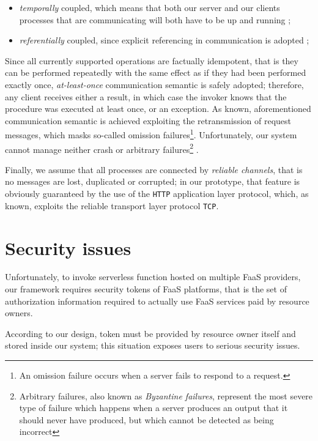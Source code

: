 \documentclass[12pt,a4paper]{report}
\begin{document}
\begin{itemize}
	
	\item \textit{temporally} coupled, which means that both our server and our clients processes that are communicating will both have to be up and running \cite{SDCC};
	
	\item \textit{referentially} coupled, since explicit referencing in communication is adopted \cite{SDCC};
	
\end{itemize}

Since all currently supported operations are factually idempotent, that is they can be performed repeatedly with the same effect as if they had been performed exactly once\cite{SDCCNUMERO2}, \textit{at-least-once} communication semantic is safely adopted; therefore, any client receives either a result, in which case the invoker knows that the procedure was executed at least once, or an exception. As known, aforementioned communication semantic is achieved exploiting the retransmission of request messages, which masks so-called omission failures\footnote{An omission failure occurs when a server fails to respond to a request.}. Unfortunately, our system cannot manage neither crash or arbitrary failures\footnote{Arbitrary failures, also known as \textit{Byzantine failures}, represent the most severe type of failure which happens when a server produces an output that it should never have produced, but which cannot be detected as being incorrect} \cite{SDCCNUMERO2}.

Finally, we assume that all processes are connected by \textit{reliable channels}, that is no messages are lost, duplicated or corrupted; in our prototype, that feature is obviously guaranteed by the use of the \texttt{HTTP} application layer protocol, which, as known, exploits the reliable transport layer protocol \texttt{TCP}. 

\section{Security issues}

Unfortunately, to invoke serverless function hosted on multiple FaaS providers, our framework requires security tokens of  FaaS platforms, that is the set of authorization information required to actually use FaaS services  paid by resource owners. 

According to our design, token must be provided by resource owner itself and stored inside our system; this situation exposes users to serious security issues. 
\end{document}
